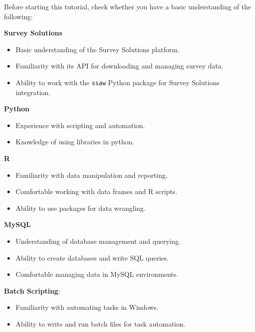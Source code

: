 \documentclass[
  letterpaper,
  DIV=11,
  numbers=noendperiod]{scrreprt}
\providecommand{\tightlist}{%
  \setlength{\itemsep}{0pt}\setlength{\parskip}{0pt}}\usepackage{longtable,booktabs,array}
\begin{document}

Before starting this tutorial, check whether you have a basic
understanding of the following:

\textbf{Survey Solutions}

\begin{itemize}
\tightlist
\item
  Basic understanding of the Survey Solutions platform.
\item
  Familiarity with its API for downloading and managing survey data.
\item
  Ability to work with the \texttt{ssaw} Python package for Survey
  Solutions integration.
\end{itemize}

\textbf{Python}

\begin{itemize}
\item
  Experience with scripting and automation.
\item
  Knowledge of using libraries in python.
\end{itemize}

\textbf{R}

\begin{itemize}
\item
  Familiarity with data manipulation and reporting.
\item
  Comfortable working with data frames and R scripts.
\item
  Ability to use packages for data wrangling.
\end{itemize}

\textbf{MySQL}

\begin{itemize}
\item
  Understanding of database management and querying.
\item
  Ability to create databases and write SQL queries.
\item
  Comfortable managing data in MySQL environments.
\end{itemize}

\textbf{Batch Scripting}:

\begin{itemize}
\item
  Familiarity with automating tasks in Windows.
\item
  Ability to write and run batch files for task automation.
\end{itemize}
\end{document}
